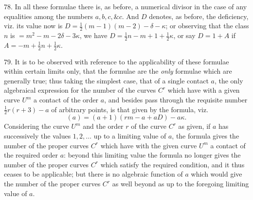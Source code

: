 \documentclass[12pt,a4paper]{article}
\begin{document}
78. In all these formulae there is, as before, a numerical divisor in the case of any equalities among the numbers $a, b, c, \&c.$ And $D$ denotes, as before, the deficiency, viz. its value now is $D = \tfrac{1}{2}(m-1)(m-2) - \delta - \kappa$; or observing that the class $n$ is $= m^2 - m - 2\delta - 3\kappa$, we have $D = \tfrac{1}{2}n - m + 1 + \tfrac{1}{2}\kappa$, or say $D = 1 + A$ if $A = -m + \tfrac{1}{2}n + \tfrac{1}{2}\kappa$.

79. It is to be observed with reference to the applicability of these formulae within certain limits only, that the formulae are the \textit{only} formulae which are generally true; thus taking the simplest case, that of a single contact $a$, the only algebraical expression for the number of the curves $C^r$ which have with a given curve $U^m$ a contact of the order $a$, and besides pass through the requisite number $\tfrac{1}{2}r(r+3) - a$ of arbitrary points, is that given by the formula, viz.
\[
(a) = (a+1)(rm - a + aD) - a\kappa.
\]
Considering the curve $U^m$ and the order $r$ of the curve $C^r$ as given, if $a$ has successively the values $1, 2, \ldots$ up to a limiting value of $a$, the formula gives the number of the proper curves $C^r$ which have with the given curve $U^m$ a contact of the required order $a$: beyond this limiting value the formula no longer gives the number of the proper curves $C^r$ which satisfy the required condition, and it thus ceases to be applicable; but there is no algebraic function of $a$ which would give the number of the proper curves $C^r$ as well beyond as up to the foregoing limiting value of $a$.
\end{document}

